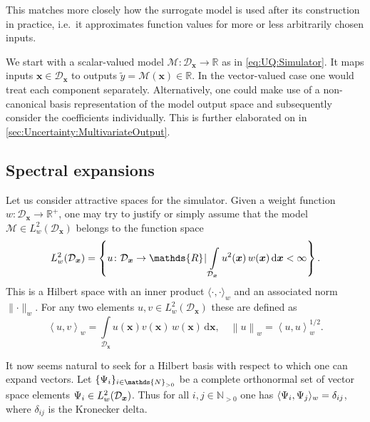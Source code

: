 This matches more closely how the surrogate model is used after its construction in practice, i.e.\ it approximates function values for more or less arbitrarily chosen inputs.
\par %
We start with a scalar-valued model \(\mathcal{M} \colon \mathcal{D}_{\bm{x}} \rightarrow \mathds{R}\) as in \cref{eq:UQ:Simulator}.
It maps inputs \(\bm{x} \in \mathcal{D}_{\bm{x}}\) to outputs \(\tilde{y} = \mathcal{M}(\bm{x}) \in \mathds{R}\).
In the vector-valued case one would treat each component separately.
Alternatively, one could make use of a non-canonical basis representation of the model output space and subsequently consider the coefficients individually.
This is further elaborated on in \cref{sec:Uncertainty:MultivariateOutput}.

\subsection{Spectral expansions}
Let us consider attractive spaces for the simulator.
Given a weight function \(w \colon \mathcal{D}_{\bm{x}} \rightarrow \mathds{R}^{+}\),
one may try to justify or simply assume that the model \(\mathcal{M} \in L_{w}^2(\mathcal{D}_{\bm{x}})\) belongs to the function space
\begin{equation} \label{eq:PCE:FunctionSpace}
  L_{w}^2(\mathcal{D}_{\bm{x}})
  = \left\{u \colon \mathcal{D}_{\bm{x}} \rightarrow \mathds{R} \cond \int\limits_{\mathcal{D}_{\bm{x}}} u^2(\bm{x}) \, w(\bm{x}) \, \mathrm{d} \bm{x} < \infty \right\}.
\end{equation}
This is a Hilbert space with an inner product \(\langle \cdot,\cdot \rangle_w\) and an associated norm \(\lVert \cdot \rVert_w\).
For any two elements \(u,v \in L_{w}^2(\mathcal{D}_{\bm{x}})\) these are defined as
\begin{equation} \label{eq:PCE:ProductNorm}
  \left\langle u,v \right\rangle_w = \int\limits_{\mathcal{D}_{\bm{x}}} u(\bm{x}) v(\bm{x}) \, w(\bm{x}) \, \mathrm{d} \bm{x}, \quad
  \left\lVert u \right\rVert_w = \left\langle u,u \right\rangle_w^{1/2}.
\end{equation}
\par %
It now seems natural to seek for a Hilbert basis with respect to which one can expand vectors.
Let \(\{\basis_{i}\}_{i \in \mathds{N}_{>0}}\) be a complete orthonormal set of vector space elements \(\Psi_{i} \in L_{w}^2(\mathcal{D}_{\bm{x}})\).
Thus for all \(i,j \in \mathds{N}_{>0}\) one has \(\langle \Psi_{i}, \Psi_{j} \rangle_w = \delta_{ij}\), where \(\delta_{ij}\) is the Kronecker delta.
